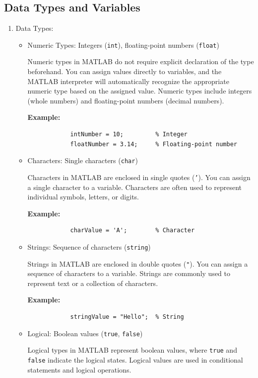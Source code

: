 \documentclass[
11pt, %
a4paper, %
oneside, %
headinclude,footinclude, %
BCOR5mm, %
]{scrartcl}
\begin{document}
\subsection{Data Types and Variables}
    \begin{enumerate}
	\item Data Types:
	\begin{itemize}
		\item Numeric Types: Integers (\texttt{int}), floating-point numbers (\texttt{float})
		
		Numeric types in MATLAB do not require explicit declaration of the type beforehand. You can assign values directly to variables, and the MATLAB interpreter will automatically recognize the appropriate numeric type based on the assigned value. Numeric types include integers (whole numbers) and floating-point numbers (decimal numbers).
		
		\textbf{Example:}
		\begin{verbatim}
			intNumber = 10;         % Integer
			floatNumber = 3.14;     % Floating-point number
		\end{verbatim}
		
		\item Characters: Single characters (\texttt{char})
		
		Characters in MATLAB are enclosed in single quotes (\texttt{'}). You can assign a single character to a variable. Characters are often used to represent individual symbols, letters, or digits.
		
		\textbf{Example:}
		\begin{verbatim}
			charValue = 'A';        % Character
		\end{verbatim}
		
		\item Strings: Sequence of characters (\texttt{string})
		
		Strings in MATLAB are enclosed in double quotes (\texttt{"}). You can assign a sequence of characters to a variable. Strings are commonly used to represent text or a collection of characters.
		
		\textbf{Example:}
		\begin{verbatim}
			stringValue = "Hello";  % String
		\end{verbatim}
		
		\item Logical: Boolean values (\texttt{true}, \texttt{false})
		
		Logical types in MATLAB represent boolean values, where \texttt{true} and \texttt{false} indicate the logical states. Logical values are used in conditional statements and logical operations.
		

\end{itemize}
\end{enumerate}
\end{document}
